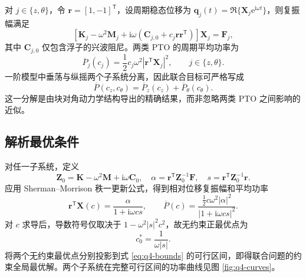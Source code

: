\documentclass[withoutpreface]{../../../templates/CUMCM2026-Complete-LaTeX/cumcmthesis}
\begin{document}
对 $j\in\{z,\theta\}$，令 $\boldsymbol r=[1,-1]^{\mathsf T}$，设周期稳态位移为 $\boldsymbol q_j(t)=\Re\{\boldsymbol X_j\mathrm e^{\mathrm i\omega t}\}$，则复振幅满足
\begin{equation}
  \left[\boldsymbol K_j-\omega^2\boldsymbol M_j+
  \mathrm i\omega\left(\boldsymbol C_{j,0}+c_j\boldsymbol r\boldsymbol r^{\mathsf T}\right)\right]
  \boldsymbol X_j=\boldsymbol F_j,
  \label{eq:q4-frequency-system}
\end{equation}
其中 $\boldsymbol C_{j,0}$ 仅包含浮子的兴波阻尼。两类 PTO 的周期平均功率为
\begin{equation}
  \overline P_j(c_j)=\frac12c_j\omega^2
  \left|\boldsymbol r^{\mathsf T}\boldsymbol X_j\right|^2,
  \qquad j\in\{z,\theta\}.
  \label{eq:q4-component-power}
\end{equation}
一阶模型中垂荡与纵摇两个子系统分离，因此联合目标可严格写成
\begin{equation}
  \boxed{\overline P(c_z,c_\theta)=\overline P_z(c_z)+\overline P_\theta(c_\theta)}.
  \label{eq:q4-total-power}
\end{equation}
这一分解是由块对角动力学结构导出的精确结果，而非忽略两类 PTO 之间影响的近似。

\subsection{解析最优条件}

对任一子系统，定义
\begin{equation}
  \boldsymbol Z_0=\boldsymbol K-\omega^2\boldsymbol M+
  \mathrm i\omega\boldsymbol C_0,
  \quad
  \alpha=\boldsymbol r^{\mathsf T}\boldsymbol Z_0^{-1}\boldsymbol F,
  \quad
  s=\boldsymbol r^{\mathsf T}\boldsymbol Z_0^{-1}\boldsymbol r.
  \label{eq:q4-rank-one-definitions}
\end{equation}
应用 Sherman--Morrison 秩一更新公式\cite{sherman1950}，得到相对位移复振幅和平均功率
\begin{equation}
  \boldsymbol r^{\mathsf T}\boldsymbol X(c)
  =\frac{\alpha}{1+\mathrm i\omega cs},
  \qquad
  \overline P(c)=
  \frac{\tfrac12c\omega^2|\alpha|^2}{|1+\mathrm i\omega cs|^2}.
  \label{eq:q4-rank-one-power}
\end{equation}
对 $c$ 求导后，导数符号仅取决于 $1-\omega^2|s|^2c^2$，故无约束正最优点为
\begin{equation}
  \boxed{c_0^*=\frac{1}{\omega|s|}}.
  \label{eq:q4-analytic-optimum}
\end{equation}
将两个无约束最优点分别投影到式 \eqref{eq:q4-bounds} 的可行区间，即得联合问题的约束全局最优解。两个子系统在完整可行区间的功率曲线见图 \ref{fig:q4-curves}。
\end{document}
